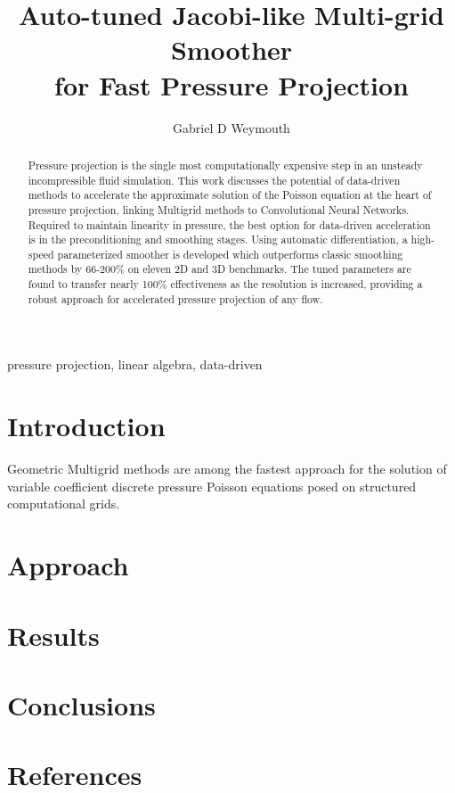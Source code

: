 \documentclass[review]{elsarticle}
\begin{document}
\begin{frontmatter}

\title{Auto-tuned Jacobi-like Multi-grid Smoother\\ for Fast Pressure Projection}

\author{Gabriel D Weymouth}
\address{Engineering and Physical Sciences, University of Southampton, Southampton, UK}
\address{Data-Centric Engineering, Alan Turing Institute, London, UK}

\begin{abstract}
Pressure projection is the single most computationally expensive step in an unsteady incompressible fluid simulation. This work discusses the potential of data-driven methods to accelerate the approximate solution of the Poisson equation at the heart of pressure projection, linking Multigrid methods to Convolutional Neural Networks. Required to maintain linearity in pressure, the best option for data-driven acceleration is in the preconditioning and smoothing stages. Using automatic differentiation, a high-speed parameterized smoother is developed which outperforms classic smoothing methods by 66-200\% on eleven 2D and 3D benchmarks. The tuned parameters are found to transfer nearly 100\% effectiveness as the resolution is increased, providing a robust approach for accelerated pressure projection of any flow.
\end{abstract}

\begin{keyword}
pressure projection, linear algebra, data-driven
\end{keyword}

\end{frontmatter}

\section{Introduction}

Geometric Multigrid methods are among the fastest approach for the solution of variable coefficient discrete pressure Poisson equations posed on structured computational grids. 

\section{Approach}

\section{Results}

\section{Conclusions}

\section*{References}


\end{document}
